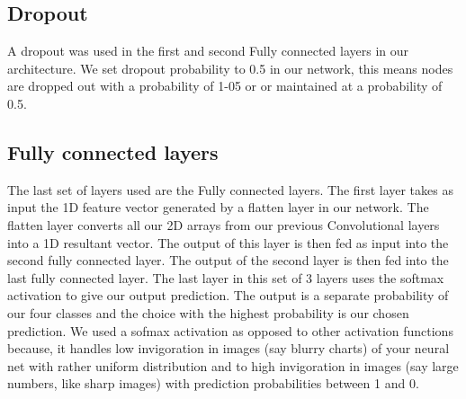 \documentclass[12pt, a4paper,oneside]{report}
\begin{document}
\subsection{Dropout}
A dropout was used in the first and second Fully connected layers in our architecture. We set dropout probability to 0.5 in our network, this means nodes are dropped out with a probability of 1-05 or or maintained at a probability of 0.5.


\subsection{Fully connected layers}
The last set of layers used are the Fully connected layers. 
The first layer takes as input the 1D feature vector generated by a flatten layer in our network. The flatten layer converts all our 2D arrays from our previous Convolutional layers into a 1D resultant vector. The output of this layer is then fed as input into the second fully connected layer. The output of the second layer is then fed into the last fully connected layer. The last layer in this set of 3 layers uses the softmax activation to give our output prediction. The output is a separate probability of our four classes and the choice with the highest probability is our chosen prediction. We used a sofmax activation as opposed to other activation functions because, it handles low invigoration
in images (say blurry charts) of your neural net with rather uniform distribution and to high invigoration in images (say large numbers, like sharp images) with prediction probabilities between 1 and 0.
\end{document}
